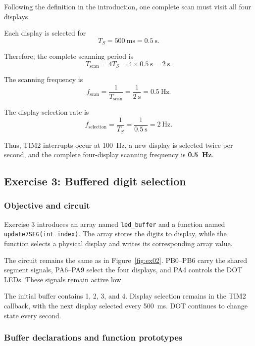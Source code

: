 \documentclass[a4paper]{article}
\begin{document}
Following the definition in the introduction,
one complete scan must visit all four displays.

Each display is selected for
\[
    T_S = 500~\mathrm{ms} = 0.5~\mathrm{s}.
\]

Therefore, the complete scanning period is
\[
    T_{\mathrm{scan}}
    = 4T_S
    = 4 \times 0.5~\mathrm{s}
    = 2~\mathrm{s}.
\]

The scanning frequency is
\[
    \boxed{
        f_{\mathrm{scan}}
        = \frac{1}{T_{\mathrm{scan}}}
        = \frac{1}{2~\mathrm{s}}
        = 0.5~\mathrm{Hz}
    }.
\]

The display-selection rate is
\[
    f_{\mathrm{selection}}
    = \frac{1}{T_S}
    = \frac{1}{0.5~\mathrm{s}}
    = 2~\mathrm{Hz}.
\]

Thus, TIM2 interrupts occur at 100~Hz, a new
display is selected twice per second, and the
complete four-display scanning frequency is
\textbf{0.5~Hz}.

\subsection{Exercise 3: Buffered digit selection}

\subsubsection{Objective and circuit}

Exercise 3 introduces an array named \texttt{led\_buffer}
and a function named \texttt{update7SEG(int index)}.
The array stores the digits to display, while the
function selects a physical display and writes
its corresponding array value.

The circuit remains the same as in
Figure~\ref{fig:ex02}. PB0--PB6 carry the shared
segment signals, PA6--PA9 select the four displays,
and PA4 controls the DOT LEDs. These signals
remain active low.

The initial buffer contains 1, 2, 3, and 4.
Display selection remains in the TIM2 callback,
with the next display selected every 500~ms.
DOT continues to change state every second.

\subsubsection{Buffer declarations and function prototypes}
\end{document}
